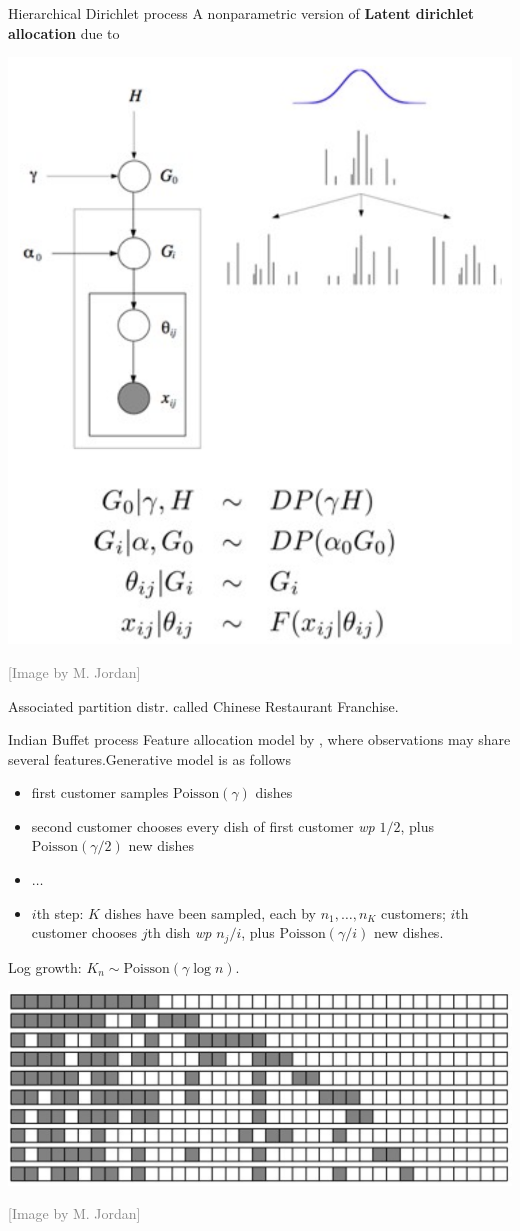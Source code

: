\begin{frame}{Hierarchical Dirichlet process}
A nonparametric version of \textbf{Latent dirichlet allocation} \citep{blei2003latent} due to  \citet{teh2006hierarchical}\\
\begin{center}
		\includegraphics[width=.5\textwidth]{figures_julyan/beyond_DP/HDP}
\end{center}
\hfill\textcolor{gray}{[Image by M. Jordan]}
\pause
	
	Associated partition distr. called \alert{Chinese Restaurant Franchise}.
\end{frame}

\begin{frame}{Indian Buffet process}
	Feature allocation model by  \citet{ghahramani2006infinite}, where observations may share several features.\pause 	\alert{Generative model is as follows}
	\begin{itemize}[<+->]
		\item first customer samples $\text{Poisson}(\gamma)$ dishes
		\item second customer chooses every dish of first customer \textit{wp} $1/2$, plus  $\text{Poisson}(\gamma/2)$ new dishes
		\item $\ldots$
		\item $i$th step: $K$ dishes have been sampled, each by $n_1,\ldots,n_K$ customers;  $i$th customer chooses $j$th dish  \textit{wp} $n_j/i$, plus  $\text{Poisson}(\gamma/i)$ new dishes.
	\end{itemize}\pause
	
	\alert{Log growth}: $K_n\sim \text{Poisson}(\gamma\log n)$.
	
		\begin{center}
			\includegraphics[width=.7\textwidth]{figures_julyan/beyond_DP/IBP_draw}
		\end{center}
		\hfill\textcolor{gray}{[Image by M. Jordan]}
\end{frame}

